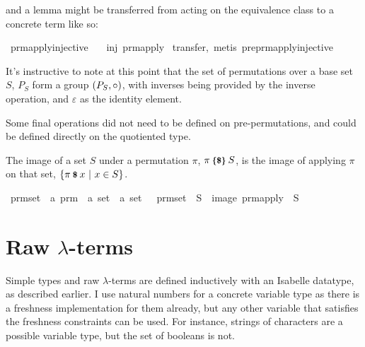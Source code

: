 and a lemma might be transferred from acting on the equivalence class to a concrete term like so:

\begin{implementation}
\isamarkupfalse%
\ prm{\isacharunderscore}apply{\isacharunderscore}injective{\isacharcolon}\isanewline
\ \ \ {\isachardoublequoteopen}inj\ {\isacharparenleft}prm{\isacharunderscore}apply\ {\isasympi}{\isacharparenright}{\isachardoublequoteclose}\isanewline
%
\isadelimproof
%
\endisadelimproof
%
\isatagproof
{}\isamarkupfalse%
{\isacharparenleft}transfer,\ metis\ preprm{\isacharunderscore}apply{\isacharunderscore}injective{\isacharparenright}%
\endisatagproof
\end{implementation}

It's instructive to note at this point that the set of permutations over a base set \(S\), \(P_S\) form a group \(\left(P_S, \circ\right)\), with inverses being provided by the inverse operation, and \(\varepsilon\) as the identity element.

Some final operations did not need to be defined on pre-permutations, and could be defined directly on the quotiented type.

\begin{definition}
The image of a set \(S\) under a permutation \(\pi\), \(\pi \mathbin{\textrm{\footnotesize{\textbf{\{\$\}}}}} S\), is the image of applying \(\pi\) on that set, \(\{\pi \mathbin{\textrm{\footnotesize{\textbf{\$}}}} x\ |\ x \in S\}\).
\end{definition}

\begin{implementation}
\isamarkupfalse%
\ prm{\isacharunderscore}set\ {\isacharcolon}{\isacharcolon}\ {\isachardoublequoteopen}{\isacharprime}a\ prm\ {\isasymRightarrow}\ {\isacharprime}a\ set\ {\isasymRightarrow}\ {\isacharprime}a\ set{\isachardoublequoteclose}\ {\isacharparenleft}\isanewline \ \ {\isachardoublequoteopen}prm{\isacharunderscore}set\ {\isasympi}\ S\ {\isasymequiv}\ image\ {\isacharparenleft}prm{\isacharunderscore}apply\ {\isasympi}{\isacharparenright}\ S{\isachardoublequoteclose}\isanewline
\end{implementation}

\section{Raw \(\lambda\)-terms}
Simple types and raw \(\lambda\)-terms are defined inductively with an Isabelle datatype, as described earlier.
I use natural numbers for a concrete variable type as there is a freshness implementation for them already, but any other variable that satisfies the freshness constraints can be used.
For instance, strings of characters are a possible variable type, but the set of booleans is not.

